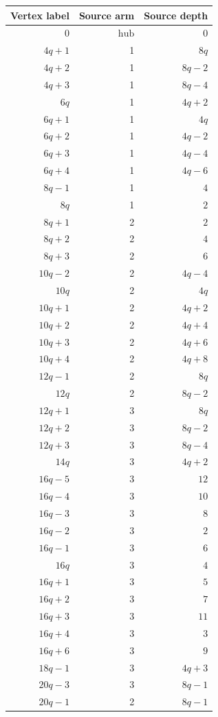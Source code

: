 \begin{longtable}{rrr}
Vertex label & Source arm & Source depth\\\hline\endhead
$0$ & $\mathrm{hub}$ & $0$\\
$4q+1$ & 1 & $8q$\\
$4q+2$ & 1 & $8q-2$\\
$4q+3$ & 1 & $8q-4$\\
$6q$ & 1 & $4q+2$\\
$6q+1$ & 1 & $4q$\\
$6q+2$ & 1 & $4q-2$\\
$6q+3$ & 1 & $4q-4$\\
$6q+4$ & 1 & $4q-6$\\
$8q-1$ & 1 & $4$\\
$8q$ & 1 & $2$\\
$8q+1$ & 2 & $2$\\
$8q+2$ & 2 & $4$\\
$8q+3$ & 2 & $6$\\
$10q-2$ & 2 & $4q-4$\\
$10q$ & 2 & $4q$\\
$10q+1$ & 2 & $4q+2$\\
$10q+2$ & 2 & $4q+4$\\
$10q+3$ & 2 & $4q+6$\\
$10q+4$ & 2 & $4q+8$\\
$12q-1$ & 2 & $8q$\\
$12q$ & 2 & $8q-2$\\
$12q+1$ & 3 & $8q$\\
$12q+2$ & 3 & $8q-2$\\
$12q+3$ & 3 & $8q-4$\\
$14q$ & 3 & $4q+2$\\
$16q-5$ & 3 & $12$\\
$16q-4$ & 3 & $10$\\
$16q-3$ & 3 & $8$\\
$16q-2$ & 3 & $2$\\
$16q-1$ & 3 & $6$\\
$16q$ & 3 & $4$\\
$16q+1$ & 3 & $5$\\
$16q+2$ & 3 & $7$\\
$16q+3$ & 3 & $11$\\
$16q+4$ & 3 & $3$\\
$16q+6$ & 3 & $9$\\
$18q-1$ & 3 & $4q+3$\\
$20q-3$ & 3 & $8q-1$\\
$20q-1$ & 2 & $8q-1$\\

\end{longtable}
